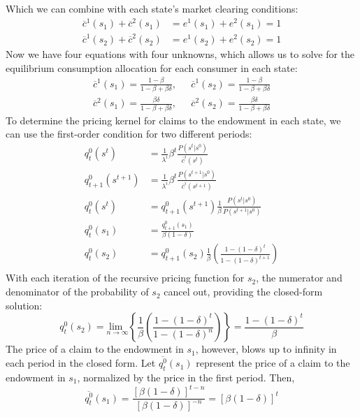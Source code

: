 \documentclass{article}
\begin{document}
\begin{enumerate}[(a)]
		Which we can combine with each state's market clearing conditions:
			\begin{align*}
				\overline{c}^1(s_1) + \overline{c}^2(s_1) &= e^1(s_1) + e^2(s_1) = 1	\\
				\overline{c}^1(s_2) + \overline{c}^2(s_2) &= e^1(s_2) + e^2(s_2) = 1
			\end{align*}
		Now we have four equations with four unknowns, which allows us to solve for the equilibrium consumption allocation for each consumer in each state:
		\begin{align*}
			\overline{c}^1(s_1) = \frac{1-\beta}{1-\beta+\beta\delta}, 		& \text{ }\overline{c}^1(s_2) = \frac{1-\beta}{1-\beta+\beta\delta}		\\
			\overline{c}^2(s_1) = \frac{\beta\delta}{1-\beta+\beta\delta}, 	& \text{ }\overline{c}^2(s_2) = \frac{\beta\delta}{1-\beta+\beta\delta}		
		\end{align*}
		To determine the pricing kernel for claims to the endowment in each state, we can use the first-order condition for two different periods:
		\begin{align*}
			q_t^0(s^t) &= \frac{1}{\lambda^i}\beta^t\frac{P(s^t|s^0)}{\overline{c}^i(s^t)}	\\
			q_{t+1}^0(s^{t+1}) &= \frac{1}{\lambda^i}\beta^t\frac{P(s^{t+1}|s^0)}{\overline{c}^i(s^{t+1})}	\\
			q_t^0(s^t) &= q_{t+1}^0(s^{t+1})\frac{1}{\beta}\frac{P(s^t|s^0)}{P(s^{t+1}|s^0)}				\\
			q_t^0(s_1) &= \frac{q_{t+1}^0(s_1)}{\beta(1-\delta)}			\\
			q_t^0(s_2) &= q_{t+1}^0(s_2)\frac{1}{\beta}\left(\frac{1-(1-\delta)^t}{1-(1-\delta)^{t+1}}\right) \\
		\end{align*}
		With each iteration of the recursive pricing function for $s_2$, the numerator and denominator of the probability of $s_2$ cancel out, providing the closed-form solution:
			\[
				q_t^0(s_2) = \underset{n\rightarrow\infty}{\text{lim }}\left\{\frac{1}{\beta}\left(\frac{1-(1-\delta)^t}{1-(1-\delta)^n}\right)\right\} = \frac{1-(1-\delta)^t}{\beta}
			\]
		The price of a claim to the endowment in $s_1$, however, blows up to infinity in each period in the closed form. Let $\overline{q^0_t}(s_1)$ represent the price of a claim to the endowment in $s_1$, normalized by the price in the first period. Then,
			\[
				\overline{q^0_t}(s_1) = \frac{\left[\beta(1-\delta)\right]^{t-n}}{\left[\beta(1-\delta)\right]^{-n}} = \left[\beta(1-\delta)\right]^t
			\]
	

\end{enumerate}
\end{document}
